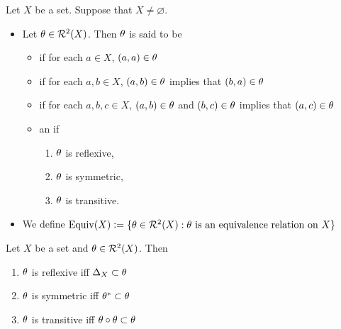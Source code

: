 \begin{defn}
	Let $X$ be a set. Suppose that $X \neq \varnothing$.
	\begin{itemize}
		\item Let $\theta \in \mathcal{R}^2(X)$. Then $\theta$ is said to be 
		\begin{itemize}
			\item {} if for each $a \in X$, $(a,a) \in \theta$
			\item {} if for each $a,b \in X$, $(a,b) \in \theta$ implies that $(b,a) \in \theta $
			\item {} if for each $a,b,c \in X$, $(a,b) \in \theta$ and $(b,c) \in \theta$ implies that $(a,c) \in \theta $
			\item an  if 
			\begin{enumerate}
				\item $\theta$ is reflexive, 
				\item $\theta$ is symmetric, 
				\item $\theta$ is transitive.
			\end{enumerate}
		\end{itemize}
		\item We define $\operatorname*{\text{Equiv}}(X) \vcentcolon= \{\theta \in \mathcal{R}^2(X): \text{$\theta$ is an equivalence relation on $X$}\}$
	\end{itemize}
\end{defn}

\begin{ex}
	Let $X$ be a set and $\theta \in \mathcal{R}^2(X)$. Then
	\begin{enumerate}
		\item $\theta$ is reflexive iff $\Delta_X \subset \theta$
		\item $\theta$ is symmetric iff $\theta^* \subset \theta$
		\item $\theta$ is transitive iff $\theta \circ \theta \subset \theta$
	\end{enumerate}
\end{ex}

